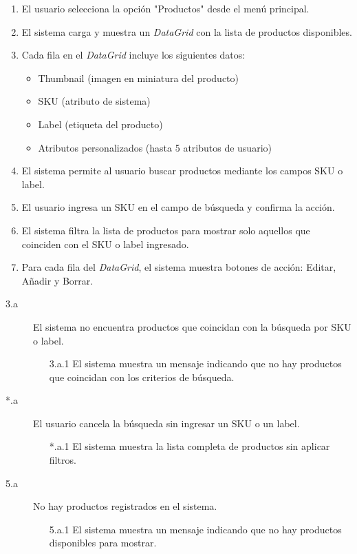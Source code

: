 \begin{enumerate}
    \item El usuario selecciona la opción "Productos" desde el menú principal.
    \item El sistema carga y muestra un \textit{DataGrid} con la lista de productos disponibles.
    \item Cada fila en el \textit{DataGrid} incluye los siguientes datos:
    \begin{itemize}
        \item Thumbnail (imagen en miniatura del producto)
        \item SKU (atributo de sistema)
        \item Label (etiqueta del producto)
        \item Atributos personalizados (hasta 5 atributos de usuario)
    \end{itemize}
    \item El sistema permite al usuario buscar productos mediante los campos SKU o label.
    \item El usuario ingresa un SKU en el campo de búsqueda y confirma la acción.
    \item El sistema filtra la lista de productos para mostrar solo aquellos que coinciden con el SKU o label ingresado.
    \item Para cada fila del \textit{DataGrid}, el sistema muestra botones de acción: Editar, Añadir y Borrar.
\end{enumerate}

\begin{description}
    \item[3.a] El sistema no encuentra productos que coincidan con la búsqueda por SKU o label.
    \begin{enumerate}
        \item[3.a.1] El sistema muestra un mensaje indicando que no hay productos que coincidan con los criterios de búsqueda.
    \end{enumerate}

    \item[*.a] El usuario cancela la búsqueda sin ingresar un SKU o un label.
    \begin{enumerate}
        \item[*.a.1] El sistema muestra la lista completa de productos sin aplicar filtros.
    \end{enumerate}

    \item[5.a] No hay productos registrados en el sistema.
    \begin{enumerate}
        \item[5.a.1] El sistema muestra un mensaje indicando que no hay productos disponibles para mostrar.
    \end{enumerate}
\end{description}

